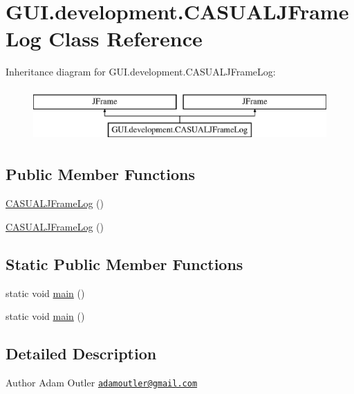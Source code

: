 \hypertarget{class_g_u_i_1_1development_1_1_c_a_s_u_a_l_j_frame_log}{\section{G\-U\-I.\-development.\-C\-A\-S\-U\-A\-L\-J\-Frame\-Log Class Reference}
\label{class_g_u_i_1_1development_1_1_c_a_s_u_a_l_j_frame_log}
}
Inheritance diagram for G\-U\-I.\-development.\-C\-A\-S\-U\-A\-L\-J\-Frame\-Log\-:\begin{figure}[H]
\begin{center}
\leavevmode
\includegraphics[height=2.000000cm]{class_g_u_i_1_1development_1_1_c_a_s_u_a_l_j_frame_log}
\end{center}
\end{figure}
\subsection*{Public Member Functions}
\begin{DoxyCompactItemize}
\item 
\hyperlink{class_g_u_i_1_1development_1_1_c_a_s_u_a_l_j_frame_log_a9ef7910e9b9d9d8c2b00af212b7e33c0}{C\-A\-S\-U\-A\-L\-J\-Frame\-Log} ()
\item 
\hyperlink{class_g_u_i_1_1development_1_1_c_a_s_u_a_l_j_frame_log_a9ef7910e9b9d9d8c2b00af212b7e33c0}{C\-A\-S\-U\-A\-L\-J\-Frame\-Log} ()
\end{DoxyCompactItemize}
\subsection*{Static Public Member Functions}
\begin{DoxyCompactItemize}
\item 
static void \hyperlink{class_g_u_i_1_1development_1_1_c_a_s_u_a_l_j_frame_log_aad38c589809152549a48f9f65af4f1b6}{main} ()
\item 
static void \hyperlink{class_g_u_i_1_1development_1_1_c_a_s_u_a_l_j_frame_log_aad38c589809152549a48f9f65af4f1b6}{main} ()
\end{DoxyCompactItemize}


\subsection{Detailed Description}
\begin{DoxyAuthor}{Author}
Adam Outler \href{mailto:adamoutler@gmail.com}{\tt adamoutler@gmail.\-com} 
\end{DoxyAuthor}


